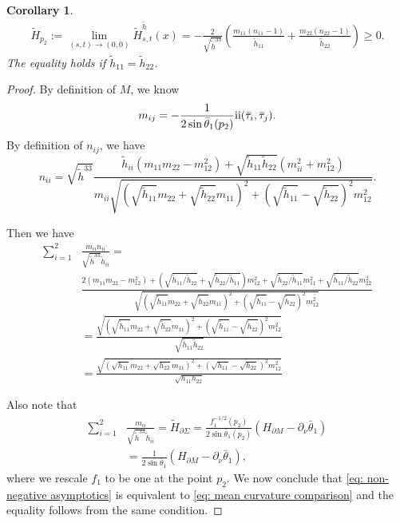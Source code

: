 \documentclass[11pt,letterpaper]{amsart}
\newcommand{\RN}[1]{%
  \textup{\uppercase\expandafter{\romannumeral#1}}%
}
\newtheorem{cor}{Corollary}[section]
\begin{document}
\begin{cor} \label{cor: non-negative asymptotics}
    \begin{align}\label{eq: non-negative asymptotics}
\tilde{H}_{p_2}:=\lim_{(s,t)\to(0,0)}\tilde{H}_{s,t}^{\tilde{h}}(x)=-\frac{2}{\sqrt{\tilde{h}^{33}}}\left(\frac{m_{11}(n_{11}-1)}{\tilde{h}_{11}}+\frac{m_{22}(n_{22}-1)}{\tilde{h}_{22}}\right)\geq 0.
    \end{align}
    The equality holds if $\tilde{h}_{11} = \tilde{h}_{22}$.
\end{cor}
\begin{proof}
    By definition of $M$, we know
    \[
    m_{ij}=-\frac{1}{2\sin\bar{\theta}_1(p_2)}\RN{2}(\bar{\tau}_i,\bar{\tau}_j).
    \]
    By definition of $n_{ij}$, we have
    \[
    n_{ii}=\sqrt{\tilde{h}^{33}}\frac{\tilde{h}_{ii}(m_{11}m_{22}-m_{12}^2)+\sqrt{\tilde{h}_{11}\tilde{h}_{22}}(m_{ii}^2+m_{12}^2)}{m_{ii}\sqrt{(\sqrt{\tilde{h}_{11}}m_{22}+\sqrt{\tilde{h}_{22}}m_{11})^2+(\sqrt{\tilde{h}_{11}}-\sqrt{\tilde{h}_{22}})^2m_{12}^2}}.
    \]

    Then we have
    \begin{align*}
        \sum_{i=1}^2&\frac{m_{ii}n_{ii}}{\sqrt{\tilde{h}^{33}}\tilde{h}_{ii}}=\\
        &\frac{2(m_{11}m_{22}-m_{12}^2)+\left(\sqrt{\tilde{h}_{11}/\tilde{h}_{22}}+\sqrt{\tilde{h}_{22}/\tilde{h}_{11}}\right)m_{12}^2+\sqrt{\tilde{h}_{22}/\tilde{h}_{11}}m_{11}^2+\sqrt{\tilde{h}_{11}/\tilde{h}_{22}}m_{22}^2}{\sqrt{(\sqrt{\tilde{h}_{11}}m_{22}+\sqrt{\tilde{h}_{22}}m_{11})^2+(\sqrt{\tilde{h}_{11}}-\sqrt{\tilde{h}_{22}})^2m_{12}^2}}\\
        &=\frac{\sqrt{(\sqrt{\tilde{h}_{11}}m_{22}+\sqrt{\tilde{h}_{22}}m_{11})^2+(\sqrt{\tilde{h}_{11}}-\sqrt{\tilde{h}_{22}})^2m_{12}^2}}{\sqrt{\tilde{h}_{11}\tilde{h}_{22}}}\\
        &=\frac{\sqrt{(\sqrt{{h}_{11}}m_{22}+\sqrt{{h}_{22}}m_{11})^2+(\sqrt{{h}_{11}}-\sqrt{{h}_{22}})^2m_{12}^2}}{\sqrt{{h}_{11}{h}_{22}}}
    \end{align*}

Also note that
\begin{align*}
    \sum_{i=1}^2&\frac{m_{ii}}{\sqrt{\tilde{h}^{33}}\tilde{h}_{ii}}=\tilde{H}_{\partial\Sigma}=\frac{f_1^{-1/2}(p_2)}{2\sin\bar{\theta}_1(p_2)}\left(H_{\partial M}-\partial_{\nu}\bar{\theta}_1\right)\\
    &=\frac{1}{2\sin\bar{\theta}_1}\left(H_{\partial M}-\partial_{\nu}\bar{\theta}_1\right),
\end{align*}
where we rescale $f_1$ to be one at the point $p_2$. We now conclude that \eqref{eq: non-negative asymptotics} is equivalent to \eqref{eq: mean curvature comparison} and the equality follows from the same condition.
\end{proof}
\end{document}
